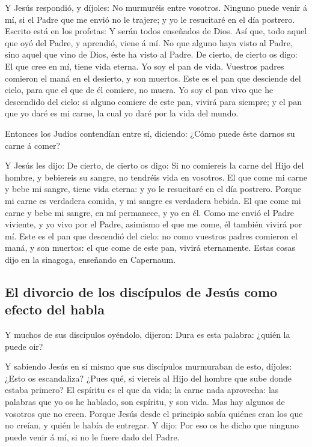  Y Jesús respondió, y díjoles: No murmuréis entre
vosotros.  Ninguno puede venir á mí, si el Padre que me
envió no le trajere; y yo le resucitaré en el día postrero.
 Escrito está en los profetas: Y serán todos enseñados de
Dios. Así que, todo aquel que oyó del Padre, y aprendió, viene á mí.
 No que alguno haya visto al Padre, sino aquel que vino
de Dios, éste ha visto al Padre.  De cierto, de cierto os
digo: El que cree en mí, tiene vida eterna.  Yo soy el
pan de vida.  Vuestros padres comieron el maná en el
desierto, y son muertos.  Este es el pan que desciende
del cielo, para que el que de él comiere, no muera.  Yo
soy el pan vivo que he descendido del cielo: si alguno comiere de este
pan, vivirá para siempre; y el pan que yo daré es mi carne, la cual yo
daré por la vida del mundo.

 Entonces los Judíos contendían entre sí, diciendo: ¿Cómo
puede éste darnos su carne á comer?

 Y Jesús les dijo: De cierto, de cierto os digo: Si no
comiereis la carne del Hijo del hombre, y bebiereis su sangre, no
tendréis vida en vosotros.  El que come mi carne y bebe
mi sangre, tiene vida eterna: y yo le resucitaré en el día postrero.
 Porque mi carne es verdadera comida, y mi sangre es
verdadera bebida.  El que come mi carne y bebe mi sangre,
en mí permanece, y yo en él.  Como me envió el Padre
viviente, y yo vivo por el Padre, asimismo el que me come, él también
vivirá por mí.  Este es el pan que descendió del cielo:
no como vuestros padres comieron el maná, y son muertos: el que come de
este pan, vivirá eternamente.  Estas cosas dijo en la
sinagoga, enseñando en Capernaum.

\hypertarget{el-divorcio-de-los-discuxedpulos-de-jesuxfas-como-efecto-del-habla}{%
\subsection{El divorcio de los discípulos de Jesús como efecto del
habla}\label{el-divorcio-de-los-discuxedpulos-de-jesuxfas-como-efecto-del-habla}}

 Y muchos de sus discípulos oyéndolo, dijeron: Dura es
esta palabra: ¿quién la puede oir?

 Y sabiendo Jesús en sí mismo que sus discípulos
murmuraban de esto, díjoles: ¿Esto os escandaliza?  ¿Pues
qué, si viereis al Hijo del hombre que sube donde estaba primero?
 El espíritu es el que da vida; la carne nada aprovecha:
las palabras que yo os he hablado, son espíritu, y son vida.
 Mas hay algunos de vosotros que no creen. Porque Jesús
desde el principio sabía quiénes eran los que no creían, y quién le
había de entregar.  Y dijo: Por eso os he dicho que
ninguno puede venir á mí, si no le fuere dado del Padre.

